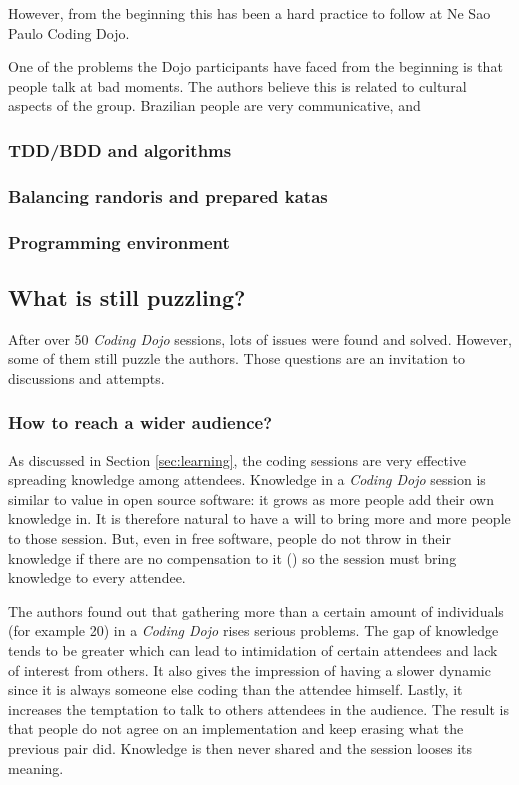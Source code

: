 However, from the beginning this has been a hard practice to follow at
Ne Sao Paulo Coding Dojo.

One of the problems the Dojo participants have faced from the beginning
is that people talk at bad moments. The authors believe this is
related to cultural aspects of the group. Brazilian people are very
communicative, and 

\subsubsection{TDD/BDD and algorithms}

\subsubsection{Balancing randoris and prepared katas}

\subsubsection{Programming environment}

\subsection{What is still puzzling?}\label{ssub:puzzles}

After over 50 \textit{Coding Dojo} sessions, lots of issues were found
and solved. However, some of them still puzzle the authors. Those
questions are an invitation to discussions and attempts.

\subsubsection{How to reach a wider audience?}

As discussed in Section \ref{sec:learning}, the coding sessions
are very effective spreading knowledge among attendees. Knowledge in a
\textit{Coding Dojo} session is similar to value in open source
software: it grows as more people add their own knowledge in. It is
therefore natural to have a will to bring more and more people to
those session. But, even in free software, people do not throw in
their knowledge if there are no compensation to it
(\cite{RishabGhosh}) so the session must bring knowledge to every
attendee.

The authors found out that gathering more than a certain amount of
individuals (for example 20) in a \textit{Coding Dojo} rises serious
problems. The gap of knowledge tends to be greater which can lead to
intimidation of certain attendees and lack of interest from others. It
also gives the impression of having a slower dynamic since it is
always someone else coding than the attendee himself. Lastly, it
increases the temptation to talk to others attendees in the
audience. The result is that people do not agree on an implementation
and keep erasing what the previous pair did. Knowledge is then never
shared and the session looses its meaning.

